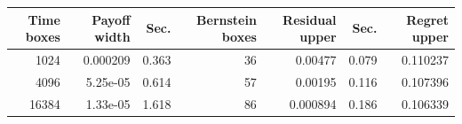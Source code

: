 \begin{tabular}{r r r r r r r}
\toprule
Time boxes & Payoff width & Sec. & Bernstein boxes & Residual upper & Sec. & Regret upper \\
\midrule
1024 & 0.000209 & 0.363 & 36 & 0.00477 & 0.079 & 0.110237 \\
4096 & 5.25e-05 & 0.614 & 57 & 0.00195 & 0.116 & 0.107396 \\
16384 & 1.33e-05 & 1.618 & 86 & 0.000894 & 0.186 & 0.106339 \\
\bottomrule
\end{tabular}
